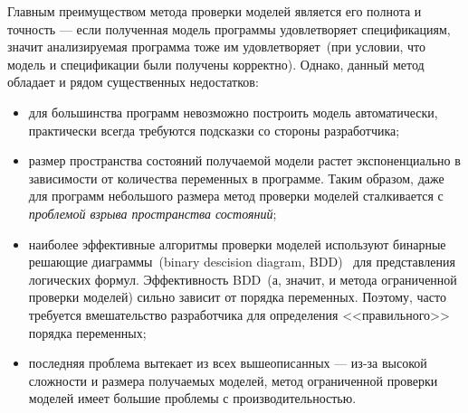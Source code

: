 Главным преимуществом метода проверки моделей является его полнота и 
точность --- если полученная модель программы удовлетворяет спецификациям, 
значит анализируемая программа тоже им удовлетворяет~(при условии, что модель 
и спецификации были получены корректно). Однако, данный метод обладает и рядом
существенных недостатков:
\begin{itemize}
\item для большинства программ невозможно построить модель автоматически,
практически всегда требуются подсказки со стороны разработчика;

\item размер пространства состояний получаемой модели растет экспоненциально в 
зависимости от количества переменных в программе. Таким образом, даже для
программ небольшого размера метод проверки моделей сталкивается с 
\emph{проблемой взрыва пространства состояний};

\item наиболее эффективные алгоритмы проверки моделей используют бинарные
решающие диаграммы~(binary descision diagram, BDD)~\cite{bdds} для 
представления логических формул. Эффективность BDD~(а, значит, и метода
ограниченной проверки моделей) сильно зависит от порядка переменных. Поэтому,
часто требуется вмешательство разработчика для определения <<правильного>>
порядка переменных;

\item последняя проблема вытекает из всех вышеописанных --- из-за высокой
сложности и размера получаемых моделей, метод ограниченной проверки моделей
имеет большие проблемы с производительностью.
\end{itemize}

